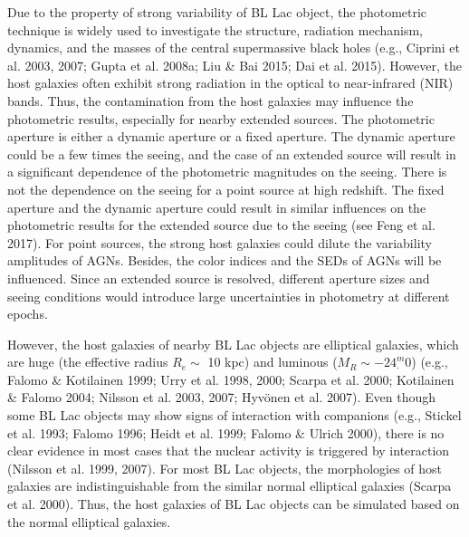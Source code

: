\documentclass[structabstract]{raa}
\begin{document}
   Due to the property of strong variability of BL Lac object, the photometric technique is widely used to investigate the structure,
   radiation mechanism, dynamics, and the masses of the central supermassive black holes (e.g., Ciprini et al. 2003, 2007; Gupta
   et al. 2008a; Liu \& Bai 2015; Dai et al. 2015). However, the host galaxies often exhibit strong radiation in the optical to near-infrared
   (NIR) bands. Thus, the contamination from the host galaxies may influence the photometric results, especially for nearby extended
   sources. The photometric aperture is either a dynamic aperture or a fixed aperture. The dynamic aperture could be a few
   times the seeing, and the case of an extended source will result in a significant dependence of the photometric magnitudes on
   the seeing. There is not the dependence on the seeing for a point source at high redshift. The fixed aperture and the dynamic
   aperture could result in similar influences on the photometric results for the extended source due to the seeing (see Feng et al.
   2017). For point sources, the strong host galaxies could dilute the variability amplitudes of AGNs. Besides, the color indices and
   the SEDs of AGNs will be influenced. Since an extended source is resolved, different aperture sizes and seeing conditions
   would introduce large uncertainties in photometry at different epochs.

   However, the host galaxies of nearby BL Lac objects are elliptical galaxies, which are huge (the effective radius $R_{e} \sim$ 10 kpc)
   and luminous ($M_{R} \sim -24^{m}_{\cdot}0$) (e.g., Falomo \& Kotilainen 1999; Urry et al. 1998, 2000; Scarpa et al. 2000; Kotilainen
   \& Falomo 2004; Nilsson et al. 2003, 2007; Hyv\"{o}nen et al. 2007). Even though some BL Lac objects may show signs of interaction
   with companions (e.g., Stickel et al. 1993; Falomo 1996; Heidt et al. 1999; Falomo \& Ulrich 2000), there is no clear evidence in most
   cases that the nuclear activity is triggered by interaction (Nilsson et al. 1999, 2007). For most BL Lac objects, the morphologies of
   host galaxies are indistinguishable from the similar normal elliptical galaxies (Scarpa et al. 2000). Thus, the host galaxies of
   BL Lac objects can be simulated based on the normal elliptical galaxies.
\end{document}
